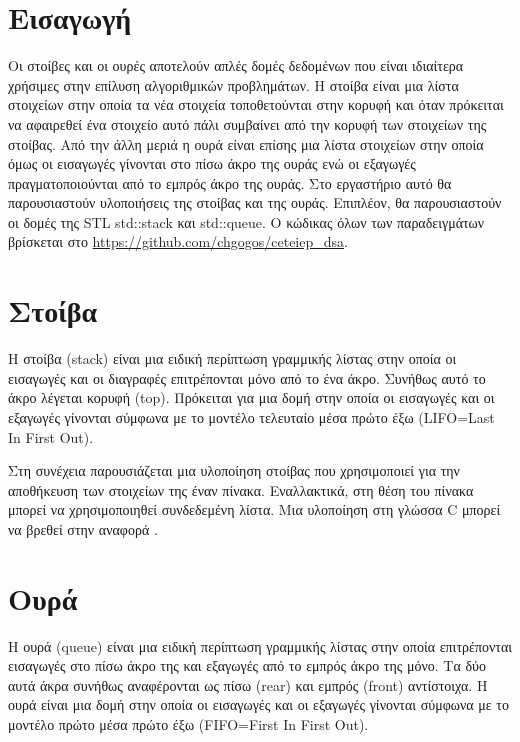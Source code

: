 \section{Εισαγωγή}
Οι στοίβες και οι ουρές αποτελούν απλές δομές δεδομένων που είναι ιδιαίτερα χρήσιμες στην επίλυση αλγοριθμικών προβλημάτων. Η στοίβα είναι μια λίστα στοιχείων στην οποία τα νέα στοιχεία τοποθετούνται στην κορυφή και όταν πρόκειται να αφαιρεθεί ένα στοιχείο αυτό πάλι συμβαίνει από την κορυφή των στοιχείων της στοίβας. Από την άλλη μεριά η ουρά είναι επίσης μια λίστα στοιχείων στην οποία όμως οι εισαγωγές γίνονται στο πίσω άκρο της ουράς ενώ οι εξαγωγές πραγματοποιούνται από το εμπρός άκρο της ουράς. Στο εργαστήριο αυτό θα παρουσιαστούν υλοποιήσεις της στοίβας και της ουράς. Επιπλέον, θα παρουσιαστούν οι δομές της STL std::stack και std::queue.
Ο κώδικας όλων των παραδειγμάτων βρίσκεται στο \href{https://github.com/chgogos/ceteiep_dsa}{https://github.com/chgogos/ceteiep\_dsa}.

\section{Στοίβα}
Η στοίβα (stack) είναι μια ειδική περίπτωση γραμμικής λίστας στην οποία οι εισαγωγές και οι διαγραφές επιτρέπονται μόνο από το ένα άκρο. Συνήθως αυτό το άκρο λέγεται κορυφή (top). Πρόκειται για μια δομή στην οποία οι εισαγωγές και οι εξαγωγές γίνονται σύμφωνα με το μοντέλο τελευταίο μέσα πρώτο έξω (LIFO=Last In First Out).

Στη συνέχεια παρουσιάζεται μια υλοποίηση στοίβας που χρησιμοποιεί για την αποθήκευση των στοιχείων της έναν πίνακα. Εναλλακτικά, στη θέση του πίνακα μπορεί να χρησιμοποιηθεί συνδεδεμένη λίστα. Μια υλοποίηση στη γλώσσα C μπορεί να βρεθεί στην αναφορά \cite{tcc_stack_linked_list}. 




\section{Ουρά}
Η ουρά (queue) είναι μια ειδική περίπτωση γραμμικής λίστας στην οποία επιτρέπονται εισαγωγές στο πίσω άκρο της και εξαγωγές από το εμπρός άκρο της μόνο. Τα δύο αυτά άκρα συνήθως αναφέρονται ως πίσω (rear) και εμπρός (front) αντίστοιχα. Η ουρά είναι μια δομή στην οποία οι εισαγωγές και οι εξαγωγές γίνονται σύμφωνα με το μοντέλο πρώτο μέσα πρώτο έξω (FIFO=First In First Out).

